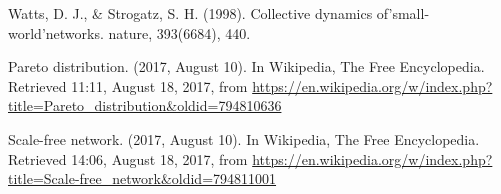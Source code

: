 \documentclass[12pt,fleqn]{article}
\begin{document}
\begin{thebibliography}{99}
Watts, D. J., \& Strogatz, S. H. (1998). Collective dynamics of'small-world'networks. nature, 393(6684), 440.

Pareto distribution. (2017, August 10). In Wikipedia, The Free Encyclopedia. Retrieved 11:11, August 18, 2017, from \url{https://en.wikipedia.org/w/index.php?title=Pareto_distribution&oldid=794810636}

Scale-free network. (2017, August 10). In Wikipedia, The Free Encyclopedia. Retrieved
14:06, August 18, 2017, from \url{https://en.wikipedia.org/w/index.php?title=Scale-free_network&oldid=794811001}
\end{thebibliography}





\end{document}
